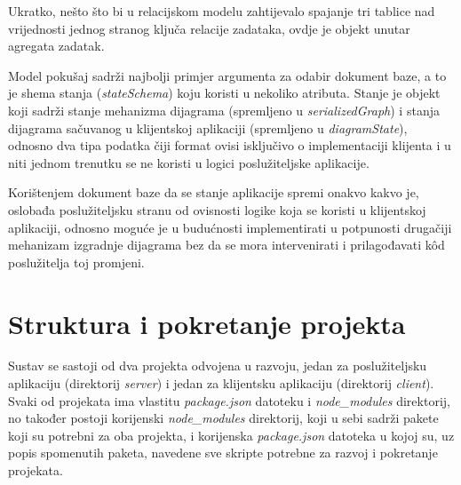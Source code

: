 \documentclass[times, utf8, diplomski, numeric]{fer}
\newcommand{\razmakp}{\vspace{18pt}}
\begin{document}
Ukratko, nešto što bi u relacijskom modelu zahtijevalo spajanje tri tablice nad vrijednosti jednog stranog ključa relacije zadataka, ovdje je objekt unutar agregata zadatak.

\razmakp

Model pokušaj sadrži najbolji primjer argumenta za odabir dokument baze, a to je shema stanja (\emph{stateSchema}) koju koristi u nekoliko atributa.
Stanje je objekt koji sadrži stanje mehanizma dijagrama (spremljeno u \emph{serializedGraph}) i stanja dijagrama sačuvanog u klijentskoj aplikaciji (spremljeno u \emph{diagramState}), odnosno dva tipa podatka čiji format ovisi isključivo o implementaciji klijenta i u niti jednom trenutku se ne koristi u logici poslužiteljske aplikacije.

Korištenjem dokument baze da se stanje aplikacije spremi onakvo kakvo je, oslobađa poslužiteljsku stranu od ovisnosti logike koja se koristi u klijentskoj aplikaciji, odnosno moguće je u budućnosti implementirati u potpunosti drugačiji mehanizam izgradnje dijagrama bez da se mora intervenirati i prilagođavati kôd poslužitelja toj promjeni.


\razmakp
\razmakp
\section{Struktura i pokretanje projekta}

Sustav se sastoji od dva projekta odvojena u razvoju, jedan za poslužiteljsku aplikaciju (direktorij \emph{server}) i jedan za klijentsku aplikaciju (direktorij \emph{client}).
Svaki od projekata ima vlastitu \emph{package.json} datoteku i \emph{node\_modules} direktorij, no također postoji korijenski  \emph{node\_modules} direktorij, koji u sebi sadrži pakete koji su potrebni za oba projekta, i korijenska \emph{package.json} datoteka u kojoj su, uz popis spomenutih paketa, navedene sve skripte potrebne za razvoj i pokretanje projekata.
\end{document}
